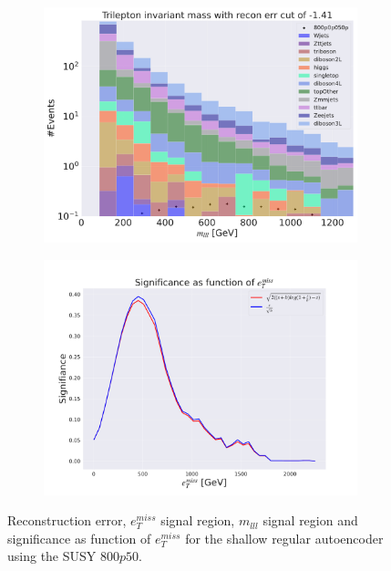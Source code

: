 \begin{figure}[H]
    \hfill
    \begin{subfigure}{.49\textwidth}
        \includegraphics[width=\textwidth]{Figures/AE_testing/small/3lep/b_data_recon_big_rm3_feats_sig_800p0p050p_mlll_recon_errcut_-1.41.pdf}
        \caption{}
        \label{fig:AE_3lep_small_mlll_800}
    \end{subfigure}
    \hfill   
    \begin{subfigure}{.49\textwidth}
        \includegraphics[width=\textwidth]{Figures/AE_testing/small/3lep/significance_etmiss_800p0p050p_-1.4089386402528896.pdf}
        \caption{}
        \label{fig:AE_3lep_small_signi_800}
    \end{subfigure}
    \hfill      
    \caption[3lep shallow network | $800p50$ | AE]{Reconstruction error, $e_T^{miss}$ signal region, $m_{lll}$ signal region and significance as function of 
    $e_T^{miss}$ for the shallow regular autoencoder using the SUSY $800p50$.}
    \label{fig:AE_3lep_small_rec_sig_signi_800}
\end{figure}

